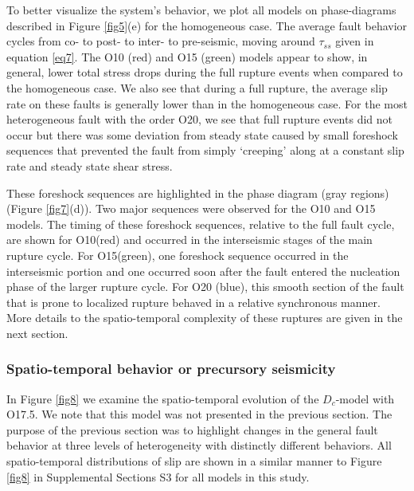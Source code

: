 \documentclass[preprint,1p, 10pt,authoryear]{elsarticle}
\begin{document}
To better visualize the system's behavior, we plot all models on phase-diagrams described in Figure \ref{fig5}(e) for the homogeneous case. The average fault behavior cycles from co- to post- to inter- to pre-seismic, moving around $\tau_{ss}$ given in equation \eqref{eq7}. The O10 (red) and O15 (green) models appear to show, in general, lower total stress drops during the full rupture events when compared to the homogeneous case.  We also see that during a full rupture, the average slip rate on these faults is generally lower than in the homogeneous case.  For the most heterogeneous fault with the order O20, we see that full rupture events did not occur but there was some deviation from steady state caused by small foreshock sequences that prevented the fault from simply `creeping' along at a constant slip rate and steady state shear stress. 

These foreshock sequences are highlighted in the phase diagram (gray regions) (Figure \ref{fig7}(d)). Two major sequences were observed for the O10 and O15 models. The timing of these foreshock sequences, relative to the full fault cycle, are shown for O10(red) and occurred in the interseismic stages of the main rupture cycle. For O15(green), one foreshock sequence occurred in the interseismic portion and one occurred soon after the fault entered the nucleation phase of the larger rupture cycle. For O20 (blue), this smooth section of the fault that is prone to localized rupture behaved in a relative synchronous manner. More details to the spatio-temporal complexity of these ruptures are given in the next section. 

\subsubsection{Spatio-temporal behavior or precursory seismicity }
\label{spatialmodel}

In Figure \ref{fig8} we examine the spatio-temporal evolution of the $D_{c}$-model with O17.5. We note that this model was not presented in the previous section. The purpose of the previous section was to highlight changes in the general fault behavior at three levels of heterogeneity with distinctly different behaviors. All spatio-temporal distributions of slip are shown in a similar manner to Figure \ref{fig8} in Supplemental Sections S3 for all models in this study.
\end{document}
